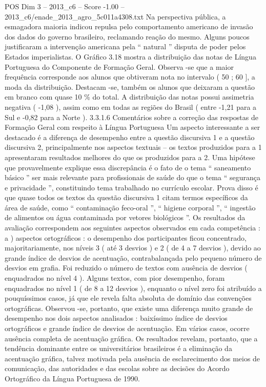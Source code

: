 \begin{textsample}{POS Dim 3 – 2013\_c6 – Score -1.00 – 2013\_c6/enade\_2013\_agro\_5c011a4308.txt}
Na perspectiva pública, a esmagadora maioria indicou repulsa pelo comportamento americano de invasão dos dados do governo brasileiro, reclamando reação do mesmo.
Alguns poucos justificaram a intervenção americana pela “ natural ” disputa de poder pelos Estados imperialistas.
O Gráfico 3.18 mostra a distribuição das notas de Língua Portuguesa do Componente de Formação Geral.
Observa -se que a maior frequência corresponde aos alunos que obtiveram nota no intervalo ( 50 ; 60 ], a moda da distribuição.
Destacam -se, também os alunos que deixaram a questão em branco com quase 10 \% do total.
A distribuição das notas possui assimetria negativa ( -1,08 ), assim como em todas as regiões do Brasil ( entre -1,21 para a Sul e -0,82 para a Norte ). 3.3.1.6 Comentários sobre a correção das respostas de Formação Geral com respeito à Língua Portuguesa Um aspecto interessante a ser destacado é a diferença de desempenho entre a questão discursiva 1 e a questão discursiva 2, principalmente nos aspectos textuais – os textos produzidos para a 1 apresentaram resultados melhores do que os produzidos para a 2.
Uma hipótese que provavelmente explique essa discrepância é o fato de o tema “ saneamento básico ” ser mais relevante para profissionais de saúde do que o tema “ segurança e privacidade ”, constituindo tema trabalhado no currículo escolar.
Prova disso é que quase todos os textos da questão discursiva 1 citam termos específicos da área de saúde, como “ contaminação feco-oral ”, “ higiene corporal ”, “ ingestão de alimentos ou água contaminada por vetores biológicos ”.
Os resultados da avaliação correspondem aos seguintes aspectos observados em cada competência : a ) aspectos ortográficos : o desempenho dos participantes ficou concentrado, majoritariamente, nos níveis 3 ( até 3 desvios ) e 2 ( de 4 a 7 desvios ), devido ao grande índice de desvios de acentuação, contrabalançada pelo pequeno número de desvios em grafia.
Foi reduzido o número de textos com ausência de desvios ( enquadrados no nível 4 ).
Alguns textos, com pior desempenho, foram enquadrados no nível 1 ( de 8 a 12 desvios ), enquanto o nível zero foi atribuído a pouquíssimos casos, já que ele revela falta absoluta de domínio das convenções ortográficas.
Observou -se, portanto, que existe uma diferença muito grande de desempenho nos dois aspectos analisados : baixíssimo índice de desvios ortográficos e grande índice de desvios de acentuação.
Em vários casos, ocorre ausência completa de acentuação gráfica.
Os resultados revelam, portanto, que a tendência dominante entre os universitários brasileiros é a eliminação da acentuação gráfica, talvez motivada pela ausência de esclarecimento dos meios de comunicação, das autoridades e das escolas sobre as decisões do Acordo Ortográfico da Língua Portuguesa de 1990.

\end{textsample}
